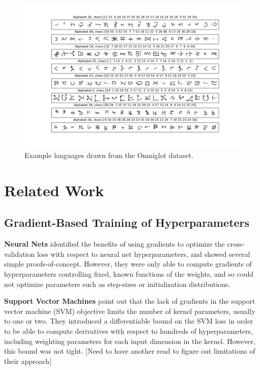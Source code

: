 \documentclass{article}
\begin{document}
\begin{figure}[ht]
\vskip 0.2in
\begin{center}
\centerline{\includegraphics[width=\columnwidth]{../experiments/Jan_27_first_omniglot_expt/random_images.png}}
\caption{Example languages drawn from the Omniglot dataset.}
\label{fig:omniglot}
\end{center}
\vskip -0.2in
\end{figure} 




\section{Related Work}

\subsection{Gradient-Based Training of Hyperparameters}
\textbf{Neural Nets}
\citet{bengio2000gradient, larsen1998adaptive} identified the benefits of using gradients to optimize the cross-validation loss with respect to neural net hyperparameters, and showed several simple proofs-of-concept.
However, they were only able to compute gradients of hyperparameters controlling fixed, known functions of the weights, and so could not optimize parameters such as step-sizes or initialization distributions.

\textbf{Support Vector Machines}
\citet{chapelle2002choosing} point out that the lack of gradients in the support vector machine (SVM) objective limits the number of kernel parameters, usually to one or two.
They introduced a differentiable bound on the SVM loss in order to be able to compute derivatives with respect to hundreds of hyperparameters, including weighting parameters for each input dimension in the kernel.
However, this bound was not tight. [Need to have another read to figure out limitations of their approach]
\end{document}
